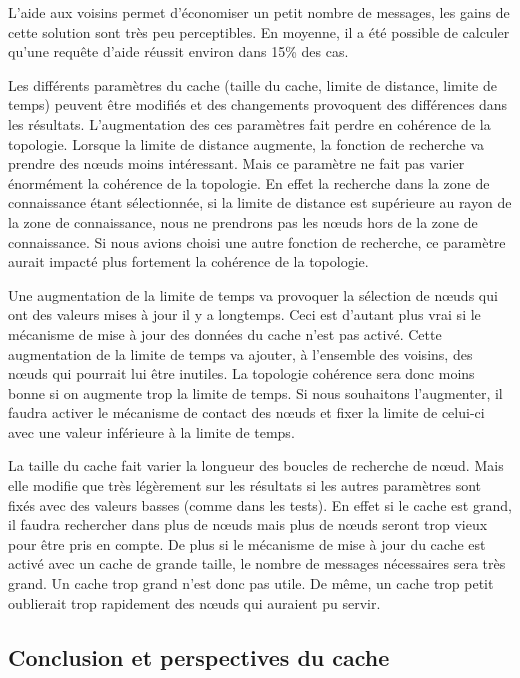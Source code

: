 \par L'aide aux voisins permet d'économiser un petit nombre de messages, les gains de cette solution sont très peu perceptibles. En moyenne, il a été possible de calculer qu'une requête d'aide réussit environ dans 15\% des cas.

\par Les différents paramètres du cache (taille du cache, limite de distance, limite de temps) peuvent être modifiés et des changements provoquent des différences dans les résultats. L'augmentation des ces paramètres fait perdre en cohérence de la topologie. Lorsque la limite de distance augmente, la fonction de recherche va prendre des nœuds moins intéressant. Mais ce paramètre ne fait pas varier énormément la cohérence de la topologie. En effet la recherche dans la zone de connaissance étant sélectionnée, si la limite de distance est supérieure au rayon de la zone de connaissance, nous ne prendrons pas les nœuds hors de la zone de connaissance. Si nous avions choisi une autre fonction de recherche, ce paramètre aurait impacté plus fortement la cohérence de la topologie.
\par Une augmentation de la limite de temps va provoquer la sélection de nœuds qui ont des valeurs mises à jour il y a longtemps. Ceci est d'autant plus vrai si le mécanisme de mise à jour des données du cache n'est pas activé. Cette augmentation de la limite de temps va ajouter, à l'ensemble des voisins, des nœuds qui pourrait lui être inutiles. La topologie cohérence sera donc moins bonne si on augmente trop la limite de temps. Si nous souhaitons l'augmenter, il faudra activer le mécanisme de contact des nœuds et fixer la limite de celui-ci avec une valeur inférieure à la limite de temps.
\par La taille du cache fait varier la longueur des boucles de recherche de nœud. Mais elle modifie que très légèrement sur les résultats si les autres paramètres sont fixés avec des valeurs basses (comme dans les tests). En effet si le cache est grand, il faudra rechercher dans plus de nœuds mais plus de nœuds seront trop vieux pour être pris en compte. De plus si le mécanisme de mise à jour du cache est activé avec un cache de grande taille, le nombre de messages nécessaires sera très grand. Un cache trop grand n'est donc pas utile. De même, un cache trop petit oublierait trop rapidement des nœuds qui auraient pu servir.  

\subsection{Conclusion et perspectives du cache} 

